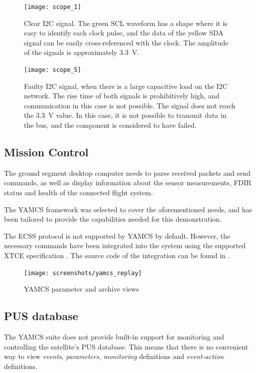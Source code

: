 \documentclass[a4paper,nobib]{tufte-book}
\begin{document}
\begin{figure}[h]
	\texttt{[image: scope\_1]}
	\label{subfig:i2c_clean}
	\caption[Clear I2C signal]{Clear \acs{I2C} signal. The green \acs{SCL} waveform has a shape where it is easy to identify each clock pulse, and the data of the yellow \acs{SDA} signal can be easily cross-referenced with the clock. The amplitude of the signals is approximately \SI{3.3}{\volt}.}
\end{figure}

\begin{figure}[h]
	\texttt{[image: scope\_5]}
	\caption[Faulty I2C signal]{Faulty \acs{I2C} signal, when there is a large capacitive load on the \acs{I2C} network. The rise time of both signals is prohibitively high, and communication in this case is not possible. The signal does not reach the \SI{3.3}{\volt} value. In this case, it is not possible to transmit data in the bus, and the component is considered to have failed.}
	\label{subfig:i2c_dirty}
\end{figure}

\FloatBarrier

\subsection{Mission Control}

The ground segment desktop computer needs to parse received packets and send commands, as well as display information about the sensor measurements, \ac{FDIR} status and health of the connected flight system.

The \acs{YAMCS} \autocite{sela_yamcs_lightweight_2012} framework was selected to cover the aforementioned needs, and has been tailored to provide the capabilities needed for this demonstration.

The \ac{ECSS} protocol \autocite{ECSS-E-ST-70-41C} is not supported by \acs{YAMCS} by default. However, the necessary commands have been integrated into the system using the supported \ac{XTCE} specification \autocite{simon_xtce_standard_2004}. The source code of the integration can be found in .

\begin{figure}[h]
	\texttt{[image: screenshots/yamcs\_replay]}
	\caption{\acs{YAMCS} parameter and archive views}
\end{figure}

\subsection{\acs{PUS} database}
The \acs{YAMCS} suite does not provide built-in support for monitoring and controlling the satellite's \acs{PUS} database. This means that there is no convenient way to view \emph{events}, \emph{parameters}, \emph{monitoring} definitions and \emph{event-action} definitions.
\end{document}
